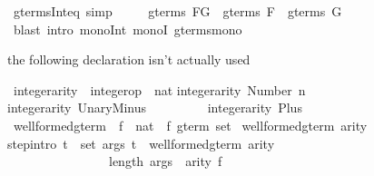 \begin{isabellebody}
\begin{isamarkuptext}
\begin{isabelle}
\end{isabelle}
%
\end{isamarkuptext}%
\isamarkupfalse%
\ gterms{\isacharunderscore}Int{\isacharunderscore}eq\ {\isacharbrackleft}simp{\isacharbrackright}{\isacharcolon}\isanewline
\ \ \ \ \ {\isachardoublequote}gterms\ {\isacharparenleft}F{\isasyminter}G{\isacharparenright}\ {\isacharequal}\ gterms\ F\ {\isasyminter}\ gterms\ G{\isachardoublequote}\isanewline
%
\isadelimproof
%
\endisadelimproof
%
\isatagproof
\isamarkupfalse%
\ {\isacharparenleft}blast\ intro{\isacharbang}{\isacharcolon}\ mono{\isacharunderscore}Int\ monoI\ gterms{\isacharunderscore}mono{\isacharparenright}%
\endisatagproof
{\isafoldproof}%
%
\isadelimproof
%
\endisadelimproof
\isamarkuptrue%
%
\begin{isamarkuptext}%
the following declaration isn't actually used%
\end{isamarkuptext}%
\isamarkupfalse%
\ integer{\isacharunderscore}arity\ {\isacharcolon}{\isacharcolon}\ {\isachardoublequote}integer{\isacharunderscore}op\ {\isasymRightarrow}\ nat{\isachardoublequote}\isanewline
\isamarkupfalse%
\isanewline
{\isachardoublequote}integer{\isacharunderscore}arity\ {\isacharparenleft}Number\ n{\isacharparenright}\ \ \ \ \ \ \ \ {\isacharequal}\ {}{\isachardoublequote}\isanewline
{\isachardoublequote}integer{\isacharunderscore}arity\ UnaryMinus\ \ \ \ \ \ \ \ {\isacharequal}\ {}{\isachardoublequote}\isanewline
{\isachardoublequote}integer{\isacharunderscore}arity\ Plus\ \ \ \ \ \ \ \ \ \ \ \ \ \ {\isacharequal}\ {}{\isachardoublequote}\isanewline
\isanewline
\isamarkupfalse%
\ well{\isacharunderscore}formed{\isacharunderscore}gterm\ {\isacharcolon}{\isacharcolon}\ {\isachardoublequote}{\isacharparenleft}{\isacharprime}f\ {\isasymRightarrow}\ nat{\isacharparenright}\ {\isasymRightarrow}\ {\isacharprime}f\ gterm\ set{\isachardoublequote}\isanewline
\isamarkupfalse%
\ {\isachardoublequote}well{\isacharunderscore}formed{\isacharunderscore}gterm\ arity{\isachardoublequote}\isanewline
{}\isanewline
step{\isacharbrackleft}intro{\isacharbang}{\isacharbrackright}{\isacharcolon}\ {\isachardoublequote}{\isasymlbrakk}{\isasymforall}t\ {\isasymin}\ set\ args{\isachardot}\ t\ {\isasymin}\ well{\isacharunderscore}formed{\isacharunderscore}gterm\ arity{\isacharsemicolon}\ \ \isanewline
\ \ \ \ \ \ \ \ \ \ \ \ \ \ \ \ length\ args\ {\isacharequal}\ arity\ f{\isasymrbrakk}\isanewline

\end{isabellebody}
